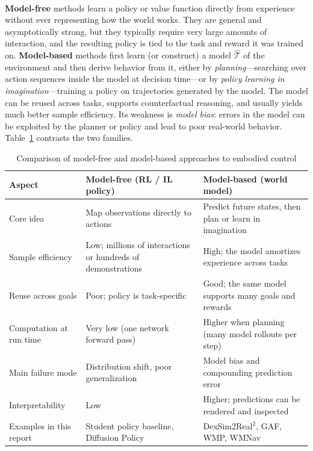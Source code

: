 \documentclass[12pt,a4paper,final]{extreport}
\begin{document}
\paragraph{} \textbf{Model-free} methods learn a policy or value function directly from experience without ever representing how the world works. They are general and asymptotically strong, but they typically require very large amounts of interaction, and the resulting policy is tied to the task and reward it was trained on. \textbf{Model-based} methods first learn (or construct) a model $\hat{\mathcal{T}}$ of the environment and then derive behavior from it, either by \emph{planning}---searching over action sequences inside the model at decision time---or by \emph{policy learning in imagination}---training a policy on trajectories generated by the model. The model can be reused across tasks, supports counterfactual reasoning, and usually yields much better sample efficiency. Its weakness is \emph{model bias}: errors in the model can be exploited by the planner or policy and lead to poor real-world behavior. Table~\ref{tab:mf_mb} contrasts the two families.

{\renewcommand{\arraystretch}{1.2}
\begin{table}[htbp]
\centering
\caption{Comparison of model-free and model-based approaches to embodied control}\label{tab:mf_mb}
\small
\begin{tabularx}{\textwidth}{|p{3.3cm}|X|X|}
\hline
\textbf{Aspect} & \textbf{Model-free (RL / IL policy)} & \textbf{Model-based (world model)} \\ \hline
Core idea & Map observations directly to actions & Predict future states, then plan or learn in imagination \\ \hline
Sample efficiency & Low; millions of interactions or hundreds of demonstrations & High; the model amortizes experience across tasks \\ \hline
Reuse across goals & Poor; policy is task-specific & Good; the same model supports many goals and rewards \\ \hline
Computation at run time & Very low (one network forward pass) & Higher when planning (many model rollouts per step) \\ \hline
Main failure mode & Distribution shift, poor generalization & Model bias and compounding prediction error \\ \hline
Interpretability & Low & Higher; predictions can be rendered and inspected \\ \hline
Examples in this report & Student policy baseline, Diffusion Policy & DexSim2Real$^2$, GAF, WMP, WMNav \\ \hline
\end{tabularx}
\end{table}}
\end{document}
